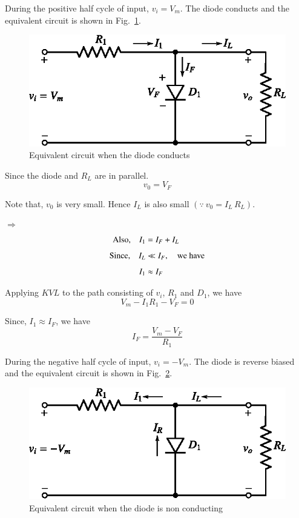During the positive half cycle of input, $v_{i}=V_{m}$. The diode conducts and the equivalent circuit is shown in Fig.~\ref{fig2.29}.
\begin{figure}[H]
\centering
\includegraphics{chap2/fig2.29.eps}
\caption{Equivalent circuit when the diode conducts}\label{fig2.29}
\end{figure}

Since the diode and $R_{L}$ are in parallel.
\begin{equation}
v_{0}=V_{F}\label{eq2.95}
\end{equation}

Note that, $v_{0}$ is very small. Hence $I_{L}$ is also small $(\because~ v_{0}=I_{L}\,R_{L})$.

$\Rightarrow$
\begin{align}
\text{Also,}\quad I_{1} &= I_{F}+I_{L}\label{eq2.96}\\[4pt]
\text{Since,}\quad I_{L} &\ll I_{F},\quad\text{we have}\notag\\[4pt]
I_{1} &\approx I_{F}\label{eq2.97}
\end{align}

Applying $KVL$ to the path consisting of $v_{i}$, $R_{1}$ and $D_{1}$, we have
\begin{equation}
V_{m}-I_{1}R_{1}-V_{F}=0\label{eq2.98}
\end{equation}

Since, $I_{1}\approx I_{F}$, we have
\begin{equation}
I_{F}=\frac{V_{m}-V_{F}}{R_{1}}\label{eq2.99}
\end{equation}

During the negative half cycle of input, $v_{i}=-V_{m}$. The diode is reverse biased and the equivalent circuit is shown in Fig.~\ref{fig2.30}.
\begin{figure}[H]
\centering
\includegraphics[scale=1.1]{chap2/fig2.30.eps}
\caption{Equivalent circuit when the diode is non conducting}\label{fig2.30}
\end{figure}

